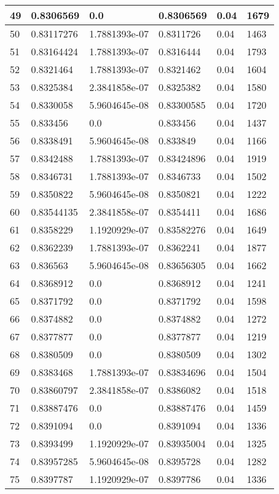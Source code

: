 \begin{longtable}{|l|l|l|l|l|l|}
49 & 0.8306569 & 0.0 & 0.8306569 & 0.04 & 1679 \\ \hline 
50 & 0.83117276 & 1.7881393e-07 & 0.8311726 & 0.04 & 1463 \\ \hline 
51 & 0.83164424 & 1.7881393e-07 & 0.8316444 & 0.04 & 1793 \\ \hline 
52 & 0.8321464 & 1.7881393e-07 & 0.8321462 & 0.04 & 1604 \\ \hline 
53 & 0.8325384 & 2.3841858e-07 & 0.8325382 & 0.04 & 1580 \\ \hline 
54 & 0.8330058 & 5.9604645e-08 & 0.83300585 & 0.04 & 1720 \\ \hline 
55 & 0.833456 & 0.0 & 0.833456 & 0.04 & 1437 \\ \hline 
56 & 0.8338491 & 5.9604645e-08 & 0.833849 & 0.04 & 1166 \\ \hline 
57 & 0.8342488 & 1.7881393e-07 & 0.83424896 & 0.04 & 1919 \\ \hline 
58 & 0.8346731 & 1.7881393e-07 & 0.8346733 & 0.04 & 1502 \\ \hline 
59 & 0.8350822 & 5.9604645e-08 & 0.8350821 & 0.04 & 1222 \\ \hline 
60 & 0.83544135 & 2.3841858e-07 & 0.8354411 & 0.04 & 1686 \\ \hline 
61 & 0.8358229 & 1.1920929e-07 & 0.83582276 & 0.04 & 1649 \\ \hline 
62 & 0.8362239 & 1.7881393e-07 & 0.8362241 & 0.04 & 1877 \\ \hline 
63 & 0.836563 & 5.9604645e-08 & 0.83656305 & 0.04 & 1662 \\ \hline 
64 & 0.8368912 & 0.0 & 0.8368912 & 0.04 & 1241 \\ \hline 
65 & 0.8371792 & 0.0 & 0.8371792 & 0.04 & 1598 \\ \hline 
66 & 0.8374882 & 0.0 & 0.8374882 & 0.04 & 1272 \\ \hline 
67 & 0.8377877 & 0.0 & 0.8377877 & 0.04 & 1219 \\ \hline 
68 & 0.8380509 & 0.0 & 0.8380509 & 0.04 & 1302 \\ \hline 
69 & 0.8383468 & 1.7881393e-07 & 0.83834696 & 0.04 & 1504 \\ \hline 
70 & 0.83860797 & 2.3841858e-07 & 0.8386082 & 0.04 & 1518 \\ \hline 
71 & 0.83887476 & 0.0 & 0.83887476 & 0.04 & 1459 \\ \hline 
72 & 0.8391094 & 0.0 & 0.8391094 & 0.04 & 1336 \\ \hline 
73 & 0.8393499 & 1.1920929e-07 & 0.83935004 & 0.04 & 1325 \\ \hline 
74 & 0.83957285 & 5.9604645e-08 & 0.8395728 & 0.04 & 1282 \\ \hline 
75 & 0.8397787 & 1.1920929e-07 & 0.8397786 & 0.04 & 1336 \\ \hline 
\end{longtable}